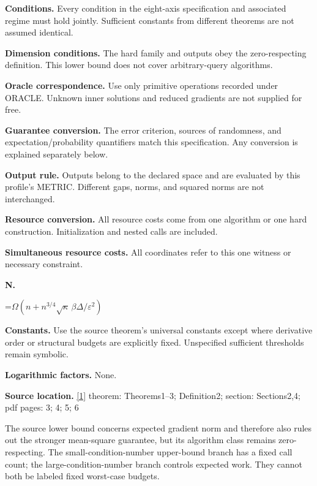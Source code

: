 \documentclass[10pt,a4paper]{article}
\newcommand{\AtlasMath}[1]{\par\begingroup\centering\setbox0=\hbox{$\displaystyle #1$}\ifdim\wd0>1.4\linewidth\typeout{ATLAS WIDE FORMULA: \the\wd0}\fi\ifdim\wd0>\linewidth\resizebox{\linewidth}{!}{\box0}\else\box0\fi\par\endgroup}
\begin{document}
\textbf{Conditions.} Every condition in the eight-axis specification and associated regime must hold jointly. Sufficient constants from different theorems are not assumed identical.



\textbf{Dimension conditions.} The hard family and outputs obey the zero-respecting definition. This lower bound does not cover arbitrary-query algorithms.



\textbf{Oracle correspondence.} Use only primitive operations recorded under ORACLE. Unknown inner solutions and reduced gradients are not supplied for free.



\textbf{Guarantee conversion.} The error criterion, sources of randomness, and expectation/probability quantifiers match this specification. Any conversion is explained separately below.



\textbf{Output rule.} Outputs belong to the declared space and are evaluated by this profile's METRIC. Different gaps, norms, and squared norms are not interchanged.



\textbf{Resource conversion.} All resource costs come from one algorithm or one hard construction. Initialization and nested calls are included.



\textbf{Simultaneous resource costs.} All coordinates refer to this one witness or necessary constraint.



\textbf{N.}



\AtlasMath{\Omega(n+n^{3/4}\sqrt\kappa\,\beta\Delta/\varepsilon^2)}


\textbf{Constants.} Use the source theorem’s universal constants except where derivative order or structural budgets are explicitly fixed. Unspecified sufficient thresholds remain symbolic.



\textbf{Logarithmic factors.} None.



\textbf{Source location.} \href{https://arxiv.org/pdf/2610.04944v1}{[1]} theorem: Theorems1--3; Definition2; section: Sections2,4; pdf pages: 3; 4; 5; 6



The source lower bound concerns expected gradient norm and therefore also rules out the stronger mean-square guarantee, but its algorithm class remains zero-respecting. The small-condition-number upper-bound branch has a fixed call count; the large-condition-number branch controls expected work. They cannot both be labeled fixed worst-case budgets.
\end{document}
